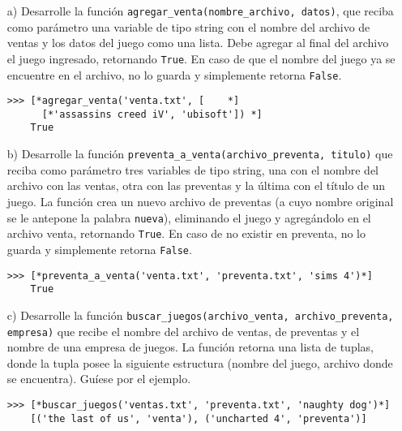   \begin{itemize}
  \item[a)]
    Desarrolle la función
    \texttt{agregar\_venta(nombre\_archivo, datos)},
    que reciba como parámetro una variable de tipo string
    con el nombre del archivo de ventas y los datos del juego
    como una lista.
    Debe agregar al final del archivo el juego ingresado,
    retornando \texttt{True}.
    En caso de que el nombre del juego ya se encuentre
    en el archivo,
    no lo guarda y simplemente retorna
    \texttt{False}.
    
    \begin{lstlisting}[style=consola]
    >>> [*agregar_venta('venta.txt', [    *]
      [*'assassins creed iV', 'ubisoft']) *]
    True
    \end{lstlisting}
  \item[b)]
    Desarrolle la función
    \texttt{preventa\_a\_venta(archivo\_preventa, titulo)}
    que reciba como parámetro tres variables de tipo string,
    una con el nombre del archivo con las ventas,
    otra con las preventas y la última con el título de un juego.
    La función crea un nuevo archivo de preventas
    (a cuyo nombre original se le antepone la palabra
    \texttt{nueva}),
    eliminando el juego y agregándolo en el archivo venta,
    retornando \texttt{True}.
    En caso de no existir en preventa,
    no lo guarda y simplemente retorna \texttt{False}.
    
    \begin{lstlisting}[style=consola]
    >>> [*preventa_a_venta('venta.txt', 'preventa.txt', 'sims 4')*]
    True
    \end{lstlisting}
  \item[c)]
    Desarrolle la función
    \texttt{buscar\_juegos(archivo\_venta, archivo\_preventa,} \\
    \texttt{empresa)}
    que recibe el nombre del archivo de ventas,
    de preventas y el nombre de una empresa de juegos.
    La función retorna una lista de tuplas,
    donde la tupla posee la siguiente estructura
    (nombre del juego, archivo donde se encuentra).
    Guíese por el ejemplo.
    
    \begin{lstlisting}[style=consola]
    >>> [*buscar_juegos('ventas.txt', 'preventa.txt', 'naughty dog')*]
    [('the last of us', 'venta'), ('uncharted 4', 'preventa')]
    \end{lstlisting}
  \end{itemize}